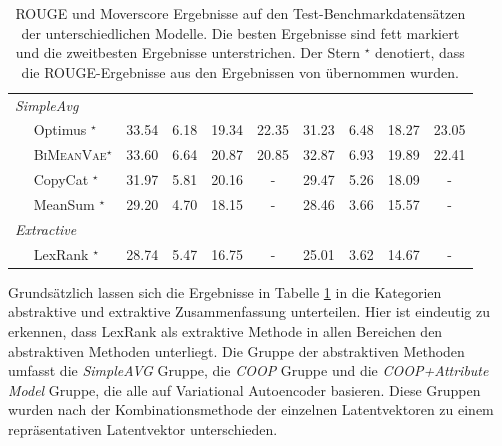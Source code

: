 \begin{table}[!h]
\begin{tabular}{@{}lcccc|cccc@{}}
    

    \textit{SimpleAvg}                   &         &         &       &      &        &        &        \\
    $\quad$ Optimus  $^{\star}$          & 33.54   & 6.18    & 19.34 & 22.35& 31.23  & 6.48   & 18.27 & 23.05\\
    $\quad$ \textsc{BiMeanVae}$^{\star}$ & 33.60   & 6.64    & 20.87 & 20.85& 32.87  & 6.93   & 19.89 & 22.41\\
    $\quad$ CopyCat  $^{\star}$          & 31.97   & 5.81    & 20.16 &-     & 29.47  & 5.26   & 18.09 & -\\ 
    $\quad$ MeanSum  $^{\star}$          & 29.20   & 4.70    & 18.15 & -    & 28.46  & 3.66   & 15.57 & -\\ \midrule
    \textit{Extractive}                  &         &         &       &      &        &        &       &      \\
    $\quad$ LexRank  $^{\star}$          & 28.74   & 5.47    & 16.75 & -    & 25.01  & 3.62   & 14.67 & -\\ \bottomrule
    \end{tabular}
    \caption{ROUGE und Moverscore Ergebnisse auf den Test-Benchmarkdatensätzen der unterschiedlichen Modelle. Die besten Ergebnisse sind fett markiert und die zweitbesten Ergebnisse unterstrichen.
    Der Stern $^{\star}$ denotiert, dass die ROUGE-Ergebnisse aus den Ergebnissen von \citep{coop} übernommen wurden.
    }
    \label{eval_results}
\end{table}

Grundsätzlich lassen sich die Ergebnisse in Tabelle \ref{eval_results} in die Kategorien abstraktive und extraktive Zusammenfassung unterteilen.
Hier ist eindeutig zu erkennen, dass LexRank als extraktive Methode in allen Bereichen den abstraktiven Methoden unterliegt. 
Die Gruppe der abstraktiven Methoden umfasst die \textit{SimpleAVG} Gruppe, die \textit{COOP} Gruppe und die \textit{COOP+Attribute Model} Gruppe, die alle auf Variational Autoencoder basieren.
Diese Gruppen wurden nach der Kombinationsmethode der einzelnen Latentvektoren zu einem repräsentativen Latentvektor unterschieden.


